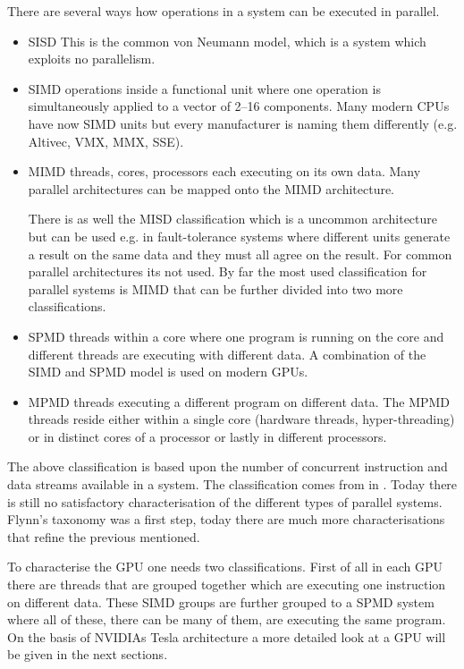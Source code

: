 There are several ways how operations in a system can be executed in parallel. 
\begin{itemize}
	\item \gls{SISD} This is the common von Neumann model, which is a system which
	exploits no parallelism.
	\item \gls{SIMD} operations inside a functional unit where one operation is 
	simultaneously applied to a vector of 2--16 components. Many modern \glspl{CPU}
	have now \gls{SIMD} units but every manufacturer is naming them differently
(e.g. Altivec, \gls{VMX}, \gls{MMX}, \gls{SSE}).
	\item \gls{MIMD} threads, cores, processors each executing on its own data. Many
	parallel architectures can be mapped onto the \gls{MIMD} architecture. 
	
	There is as well the \gls{MISD} classification which is a uncommon architecture but
	can be used e.g. in fault-tolerance systems where different units generate a result 
	on the same data and they must all agree on the result. For common parallel architectures
	its not used. By far the most used classification for parallel systems is \gls{MIMD}
	that can be further divided into two more classifications. 
	
	\item \gls{SPMD} threads within a core where one program is running on the core
	and different threads are executing with different data. A combination of the 
	\gls{SIMD} and \gls{SPMD} model is used on modern \glspl{GPU}.
	\item \gls{MPMD} threads executing a different program on different data. The 
	\gls{MPMD} threads reside either within a single core (hardware threads,
	hyper-threading) or in distinct cores of a processor or lastly in different
	processors.
\end{itemize}
The above classification is based upon the number of concurrent instruction and 
data streams available in a system. The classification comes from \citeauthor{citeulike:3789408}
in \citep{citeulike:3789408}. Today there is  still no satisfactory characterisation 
of the different types of parallel systems. Flynn's taxonomy was a first step, 
today there are much more characterisations that refine the previous mentioned. 

To characterise the \gls{GPU} one needs two classifications. First of all in
each \gls{GPU} there are threads that are grouped together which are executing 
one instruction on different data. These \gls{SIMD} groups are further grouped
to a \gls{SPMD} system where all of these, there can be many of them, are
executing the same program. On the basis of \glspl{NVIDIA} Tesla architecture 
a more detailed look at a \gls{GPU} will be given in the next sections.


